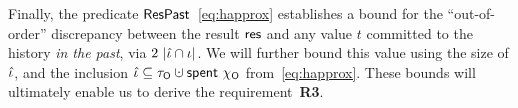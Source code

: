 Finally, the predicate $\mathsf{ResPast}$~\eqref{eq:happrox} establishes a
bound for the ``out-of-order'' discrepancy between the result $\mathsf{res}$
and any value $t$ committed to the history \emph{in the past}, via
$2~|\hat{\iota} \cap \iota|$. We will further bound this value using the size
of $\hat{\iota}$, and the inclusion $\iknh \subseteq \tkno \hunion
\Tomb~\histo$ from~\eqref{eq:happrox}. These bounds will ultimately
enable us to derive the requirement~\textbf{R3}.




